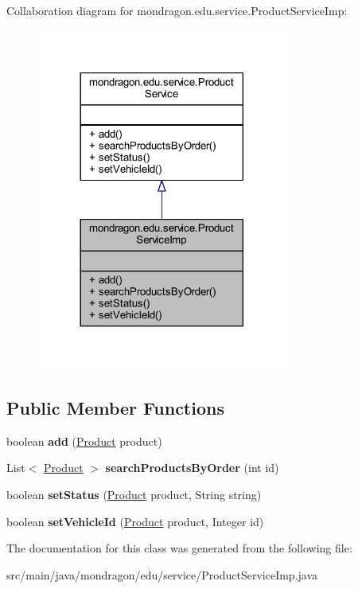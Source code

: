 Collaboration diagram for mondragon.\+edu.\+service.\+Product\+Service\+Imp\+:\nopagebreak
\begin{figure}[H]
\begin{center}
\leavevmode
\includegraphics[width=233pt]{classmondragon_1_1edu_1_1service_1_1_product_service_imp__coll__graph}
\end{center}
\end{figure}
\subsection*{Public Member Functions}
\begin{DoxyCompactItemize}
\item 
\mbox{\label{classmondragon_1_1edu_1_1service_1_1_product_service_imp_a3ac85a5be62230db7c7272cc072bd571}} 
boolean {\bfseries add} (\mbox{\hyperlink{classmondragon_1_1edu_1_1clases_1_1_product}{Product}} product)
\item 
\mbox{\label{classmondragon_1_1edu_1_1service_1_1_product_service_imp_a03715bfabee707901c645106a193ac6b}} 
List$<$ \mbox{\hyperlink{classmondragon_1_1edu_1_1clases_1_1_product}{Product}} $>$ {\bfseries search\+Products\+By\+Order} (int id)
\item 
\mbox{\label{classmondragon_1_1edu_1_1service_1_1_product_service_imp_a17728c8bf1f9ebf0ecdefef12094c057}} 
boolean {\bfseries set\+Status} (\mbox{\hyperlink{classmondragon_1_1edu_1_1clases_1_1_product}{Product}} product, String string)
\item 
\mbox{\label{classmondragon_1_1edu_1_1service_1_1_product_service_imp_ab3a3ac91199f0c457d0ffcc1c881c33e}} 
boolean {\bfseries set\+Vehicle\+Id} (\mbox{\hyperlink{classmondragon_1_1edu_1_1clases_1_1_product}{Product}} product, Integer id)
\end{DoxyCompactItemize}


The documentation for this class was generated from the following file\+:\begin{DoxyCompactItemize}
\item 
src/main/java/mondragon/edu/service/Product\+Service\+Imp.\+java\end{DoxyCompactItemize}
